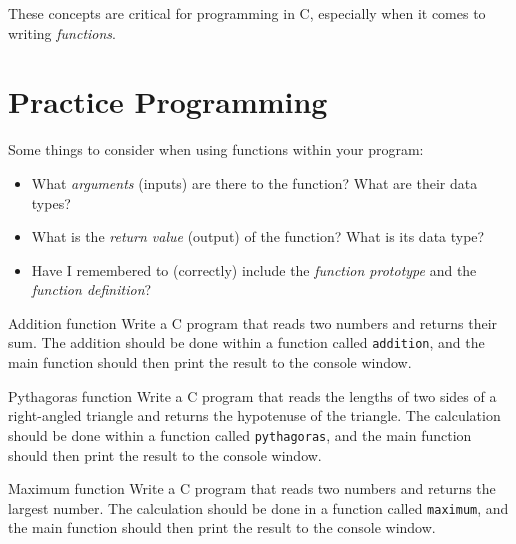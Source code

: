 \documentclass{pass}
\begin{document}
These concepts are critical for programming in C, especially when it comes to writing \textit{functions}.

\pagebreak

\section*{Practice Programming}
Some things to consider when using functions within your program:
\begin{itemize}
\item What \textit{arguments} (inputs) are there to the function? What are their data types?
\item What is the \textit{return value} (output) of the function? What is its data type?
\item Have I remembered to (correctly) include the \textit{function prototype} and the \textit{function definition}?
\end{itemize}


\begin{task}{Addition function}{}
Write a C program that reads two numbers and returns their sum. The addition should be done within a function called \texttt{addition}, and the main function should then print the result to the console window.
\end{task}

\begin{task}{Pythagoras function}{}
Write a C program that reads the lengths of two sides of a right-angled triangle and returns the hypotenuse of the triangle. The calculation should be done within a function called \texttt{pythagoras}, and the main function should then print the result to the console window.
\end{task}

\begin{task}{Maximum function}{}
Write a C program that reads two numbers and returns the largest number. The calculation should be done in a function called \texttt{maximum}, and the main function should then print the result to the console window.
\end{task}
\end{document}
